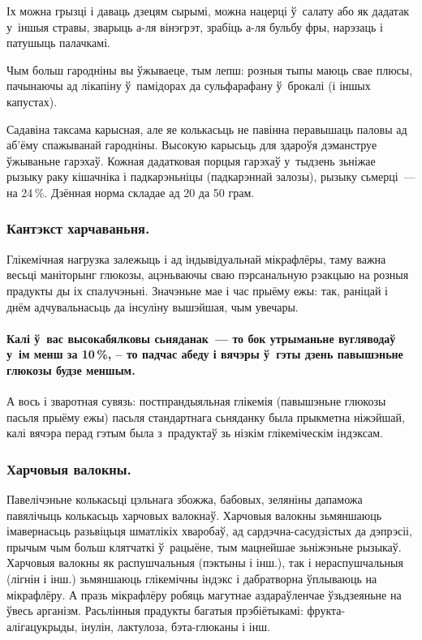 Іх можна грызці і даваць дзецям сырымі, можна нацерці ў~салату або як дадатак у~іншыя стравы, зварыць а-ля вінэгрэт, зрабіць а-ля бульбу фры, нарэзаць і патушыць палачкамі. 

Чым больш гародніны вы ўжываеце, тым лепш: розныя тыпы маюць свае плюсы, пачынаючы ад лікапіну ў~памідорах да сульфарафану ў~брокалі (і іншых капустах).

Садавіна таксама карысная, але яе колькасьць не павінна перавышаць паловы ад аб'ёму спажыванай гародніны. Высокую карысьць для здароўя дэманструе ўжываньне гарэхаў. Кожная дадатковая порцыя гарэхаў у~тыдзень зьніжае рызыку раку кішачніка і падкарэньніцы (падкарэннай залозы), рызыку сьмерці~--- на 24\,\%. Дзённая норма складае ад 20 да 50 грам.

\subsubsection{Кантэкст харчаваньня.}
Глікемічная нагрузка залежыць і ад індывідуальнай мікрафлёры, таму важна весьці маніторынг глюкозы, ацэньваючы сваю пэрсанальную рэакцыю на розныя прадукты ды іх спалучэньні. Значэньне мае і час прыёму ежы: так, раніцай і днём адчувальнасьць да інсуліну вышэйшая, чым увечары. 

\paragraph{Калі ў~вас высокабялковы сьняданак~--- то бок утрыманьне вугляводаў у~ім менш за 10\,\%, -- то падчас абеду і вячэры ў~гэты дзень павышэньне глюкозы будзе меншым.} А вось і зваротная сувязь: постпрандыяльная глікемія (павышэньне глюкозы пасьля прыёму ежы) пасьля стандартнага сьняданку была прыкметна ніжэйшай, калі вячэра перад гэтым была з~прадуктаў зь нізкім глікеміческім індэксам.

\subsubsection{Харчовыя валокны.}
Павелічэньне колькасьці цэльнага збожжа, бабовых, зеляніны дапаможа павялічыць колькасьць харчовых валокнаў. Харчовыя валокны зьмяншаюць імавернасьць разьвіцьця шматлікіх хваробаў, ад сардэчна-сасудзістых да дэпрэсіі, прычым чым больш клятчаткі ў~рацыёне, тым мацнейшае зьніжэньне рызыкаў. Харчовыя валокны як распушчальныя (пэктыны і інш.), так і нераспушчальныя (лігнін і інш.) зьмяншаюць глікемічны індэкс і дабратворна ўплываюць на мікрафлёру. А празь мікрафлёру робяць магутнае аздараўленчае ўзьдзеяньне на ўвесь арганізм. Расьлінныя прадукты багатыя прэбіётыкамі: фрукта-алігацукрыды, інулін, лактулоза, бэта-глюканы і інш.


